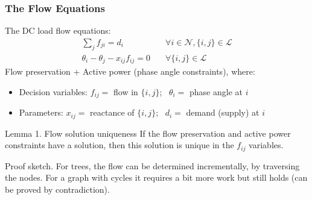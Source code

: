 \documentclass{beamer}
\begin{document}

\begin{frame}
\frametitle{The Flow Equations}\footnotesize
The DC load flow equations:
\begin{align*}
	\sum_j{f_{ji}} = d_i & \quad\forall i\in\mathcal{N}, \{i,j\}\in\mathcal{L}\\
	\theta_i-\theta_j-x_{ij}f_{ij}=0 & \quad\forall \{i,j\}\in\mathcal{L}
\end{align*}
Flow preservation + Active power (phase angle constraints), where:
\begin{itemize}
	\item Decision variables: $f_{ij}=$ flow in $\{i,j\}$; \ $\theta_i=$ phase angle at $i$
	\item Parameters: $x_{ij}=$ reactance of $\{i,j\}$; \ $d_i=$ demand (supply) at $i$
\end{itemize}

\begin{block}{\small Lemma 1. Flow solution uniqueness}
If the flow preservation and active power constraints have a solution, then this solution is unique in the $f_{ij}$ variables.
\end{block}
Proof sketch. For trees, the flow can be determined incrementally, by traversing the nodes. For a graph with cycles it requires a bit more work but still holds (can be proved by contradiction).
\end{frame}
\end{document}
